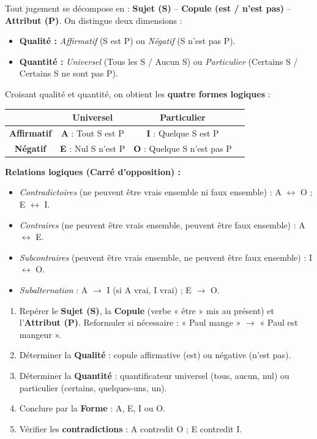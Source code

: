 \documentclass[11pt]{article}
\begin{document}
\begin{propriete}
Tout jugement se décompose en : \textbf{Sujet (S)} -- \textbf{Copule (est / n'est pas)} -- \textbf{Attribut (P)}.
On distingue deux dimensions :
\begin{itemize}
\item \textbf{Qualité :} \emph{Affirmatif} (S est P) ou \emph{Négatif} (S n'est pas P).
\item \textbf{Quantité :} \emph{Universel} (Tous les S / Aucun S) ou \emph{Particulier} (Certains S / Certains S ne sont pas P).
\end{itemize}
Croisant qualité et quantité, on obtient les \textbf{quatre formes logiques} :
\begin{center}
\begin{tabular}{|c|c|c|c|}\hline
 & \textbf{Universel} & \textbf{Particulier} \\ \hline
\textbf{Affirmatif} & \textbf{A} : Tout S est P & \textbf{I} : Quelque S est P \\ \hline
\textbf{Négatif} & \textbf{E} : Nul S n'est P & \textbf{O} : Quelque S n'est pas P \\ \hline
\end{tabular}
\end{center}
\textbf{Relations logiques (Carré d'opposition) :}
\begin{itemize}
\item \emph{Contradictoires} (ne peuvent être vrais ensemble ni faux ensemble) : A $\leftrightarrow$ O ; E $\leftrightarrow$ I.
\item \emph{Contraires} (ne peuvent être vrais ensemble, peuvent être faux ensemble) : A $\leftrightarrow$ E.
\item \emph{Subcontraires} (peuvent être vrais ensemble, ne peuvent être faux ensemble) : I $\leftrightarrow$ O.
\item \emph{Subalternation} : A $\rightarrow$ I (si A vrai, I vrai) ; E $\rightarrow$ O.
\end{itemize}
\end{propriete}

\begin{methode}
\begin{enumerate}
\item Repérer le \textbf{Sujet (S)}, la \textbf{Copule} (verbe « être » mis au présent) et l'\textbf{Attribut (P)}. Reformuler si nécessaire : « Paul mange » $\rightarrow$ « Paul est mangeur ».
\item Déterminer la \textbf{Qualité} : copule affirmative (est) ou négative (n'est pas).
\item Déterminer la \textbf{Quantité} : quantificateur universel (tous, aucun, nul) ou particulier (certains, quelques-uns, un).
\item Conclure par la \textbf{Forme} : A, E, I ou O.
\item Vérifier les \textbf{contradictions} : A contredit O ; E contredit I.
\end{enumerate}
\end{methode}
\end{document}

